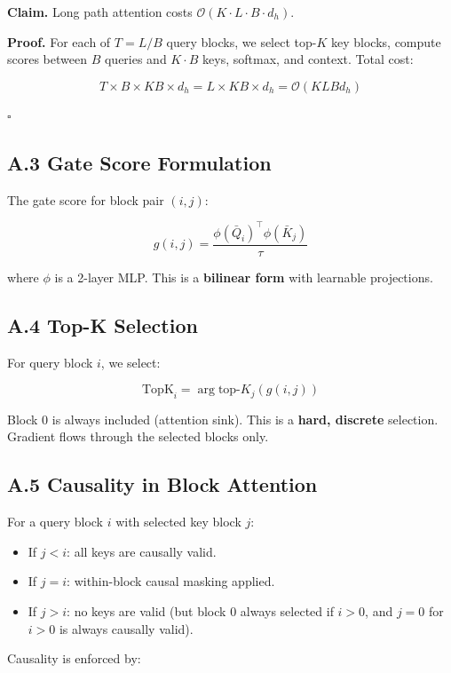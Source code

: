 \textbf{Claim.} Long path attention costs $\mathcal{O}(K \cdot L \cdot B \cdot d_h)$.

\textbf{Proof.} For each of $T = L/B$ query blocks, we select top-$K$ key 
blocks, compute scores between $B$ queries and $K \cdot B$ keys, softmax, 
and context. Total cost:

\[
T \times B \times K B \times d_h = L \times K B \times d_h = \mathcal{O}(K L B d_h)
\tag{A.2}
\]

$\square$

\subsection{A.3 Gate Score Formulation}

The gate score for block pair $(i, j)$:

\[
g(i, j) = \frac{\phi(\bar{Q}_i)^\top \phi(\bar{K}_j)}{\tau}
\tag{A.3}
\]

where $\phi$ is a 2-layer MLP. This is a \textbf{bilinear form} with learnable 
projections.

\subsection{A.4 Top-K Selection}

For query block $i$, we select:

\[
\text{TopK}_i = \arg\text{top-}K_j (g(i, j))
\tag{A.4}
\]

Block 0 is always included (attention sink). This is a \textbf{hard, discrete} 
selection. Gradient flows through the selected blocks only.

\subsection{A.5 Causality in Block Attention}

For a query block $i$ with selected key block $j$:

\begin{itemize}
\item If $j < i$: all keys are causally valid.
\item If $j = i$: within-block causal masking applied.
\item If $j > i$: no keys are valid (but block 0 always selected if $i > 0$,
  and $j = 0$ for $i > 0$ is always causally valid).

\end{itemize}
Causality is enforced by:

